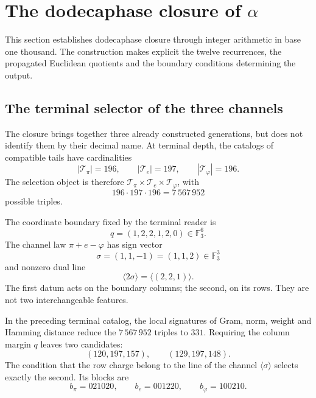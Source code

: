 \chapter{The dodecaphase closure of \texorpdfstring{\(\alpha\)}{alpha}}
\label{chap:alpha}

This section establishes dodecaphase closure through integer arithmetic in
base one thousand. The construction makes explicit the twelve recurrences, the propagated
Euclidean quotients and the boundary conditions determining the output.

\section{The terminal selector of the three channels}
\label{sec:selector-terminal-alpha-rev6}

The closure brings together three already constructed generations, but does not identify them by
their decimal name. At terminal depth, the catalogs of compatible tails
have cardinalities
\[
 |\mathcal T_\pi|=196,\qquad
 |\mathcal T_e|=197,\qquad
 |\mathcal T_\varphi|=196.
\]
The selection object is therefore
\(\mathcal T_\pi\times\mathcal T_e\times\mathcal T_\varphi\), with
\[
 196\cdot197\cdot196=7\,567\,952
\]
possible triples.

The coordinate boundary fixed by the terminal reader is
\[
 q=(1,2,2,1,2,0)\in\mathbb F_3^6.
\]
The channel law \(\pi+e-\varphi\) has sign vector
\[
 \sigma=(1,1,-1)=(1,1,2)\in\mathbb F_3^3
\]
and nonzero dual line
\[
 \langle2\sigma\rangle
 =\langle(2,2,1)\rangle.
\]
The first datum acts on the boundary columns; the second, on
its rows. They are not two interchangeable features.

\begin{theorem}
\label{thm:selector-terminal-alpha-rev6}
In the preceding terminal catalog, the local signatures of Gram, norm, weight and
Hamming distance reduce the \(7\,567\,952\) triples to \(331\). Requiring
the column margin \(q\) leaves two candidates:
\[
 (120,197,157),\qquad(129,197,148).
\]
The condition that the row charge belong to the line of the channel
\(\langle\sigma\rangle\) selects exactly the second. Its blocks are
\[
 \boxed{
 b_\pi=021020,\qquad
 b_e=001220,\qquad
 b_\varphi=100210.}
\]
\end{theorem}


